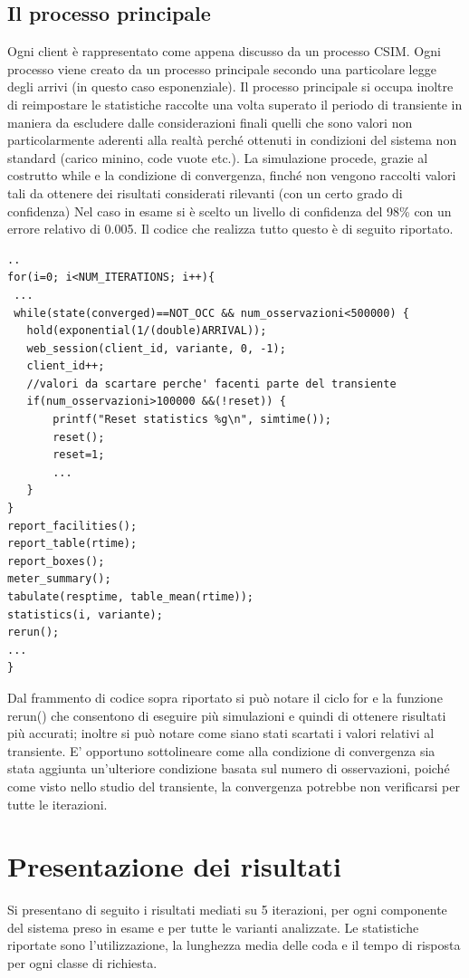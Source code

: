 \subsection{Il processo principale}
Ogni client è rappresentato come appena discusso da un processo CSIM. Ogni processo viene 
creato da un processo principale secondo una particolare legge degli arrivi (in questo caso 
esponenziale). Il processo principale si occupa inoltre di reimpostare le statistiche raccolte una volta 
superato il periodo di transiente in maniera da escludere dalle considerazioni finali quelli che sono valori non particolarmente aderenti alla realtà perché ottenuti in condizioni del sistema non standard (carico minino, code vuote etc.). 
La simulazione procede, grazie al costrutto while e la condizione di convergenza, finché non 
vengono raccolti valori tali da ottenere dei risultati considerati rilevanti (con un certo grado di confidenza) Nel caso in esame si è scelto un livello di confidenza del 98\% con un errore relativo  di 0.005.
Il codice che realizza tutto questo è di seguito riportato. 
\begin{lstlisting}
..
for(i=0; i<NUM_ITERATIONS; i++){
 ...
 while(state(converged)==NOT_OCC && num_osservazioni<500000) { 
   hold(exponential(1/(double)ARRIVAL)); 
   web_session(client_id, variante, 0, -1); 
   client_id++; 
   //valori da scartare perche' facenti parte del transiente
   if(num_osservazioni>100000 &&(!reset)) { 
       printf("Reset statistics %g\n", simtime()); 
       reset(); 
       reset=1; 
       ...
   } 
} 
report_facilities(); 
report_table(rtime); 
report_boxes(); 
meter_summary(); 
tabulate(resptime, table_mean(rtime)); 
statistics(i, variante); 
rerun();
...
}
\end{lstlisting}
Dal frammento di codice sopra riportato si può notare il ciclo for e la funzione rerun() che consentono di eseguire più simulazioni e quindi di ottenere risultati più accurati; inoltre si può notare come siano stati scartati i valori relativi al transiente. E' opportuno sottolineare come alla condizione di convergenza sia stata aggiunta un'ulteriore condizione basata sul numero di osservazioni, poiché come visto nello studio del transiente, la convergenza potrebbe non verificarsi per tutte le iterazioni.

\section{Presentazione dei risultati}
Si presentano di seguito i risultati mediati su 5 iterazioni, per ogni componente del sistema preso in esame e per tutte le varianti analizzate. Le statistiche riportate sono l'utilizzazione, la lunghezza media delle coda e il tempo di risposta per ogni classe di richiesta.
